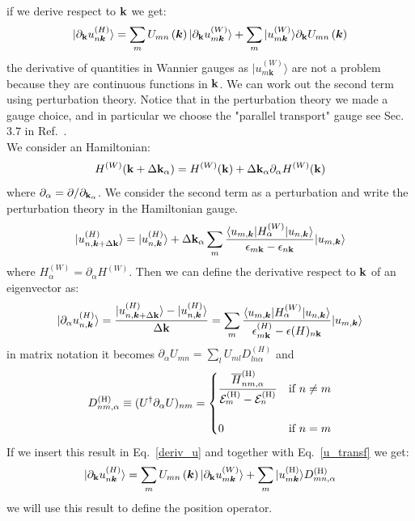 \documentclass[preprint,showpacs,prb,superscriptaddress,aps,floatfix]{revtex4-1}
\newcommand{\kk}{{\bf k}}
\newcommand{\be}{\begin{equation}}
\newcommand{\ee}{\end{equation}}
\renewcommand{\[}{\left[}
\renewcommand{\]}{\right]}
\renewcommand{\(}{\left(}
\renewcommand{\)}{\right)}
\def\ket#1{\vert#1\rangle}
\def\bra#1{\langle#1\vert}
\def\ph{^{({\rm H})}}
\def\D{{D}\ph}
\begin{document}
if we derive respect to $\kk$ we get:
\begin{equation}
	\ket{ \partial_{\kk} u_{n\boldsymbol{k}}^{\left(H\right)}}=\sum_{m}U_{mn}\left(\boldsymbol{k}\right)\ket{\partial_{\kk} u_{m\boldsymbol{k}}^{\left(W\right)}} + \sum_{m}\ket{u_{m\boldsymbol{k}}^{\left(W\right)}} \partial_\kk U_{mn}\left(\boldsymbol{k}\right)
	\label{deriv_u}
\end{equation}
the derivative of quantities in Wannier gauges as $\ket{u_{m\boldsymbol{k}}^{\left(W\right)}}$ are not a problem because they are continuous functions in $\kk$. We can work out the second term using perturbation theory.\cite{wang2006ab} 
Notice that in the perturbation theory we made a gauge choice, and in particular we choose the "parallel transport" gauge see Sec.~$3.7$ in Ref.~. \\
We consider an Hamiltonian:
\be
H^{(W)} (\kk + \Delta \kk_\alpha) = H^{(W)} (\kk)  + \Delta \kk_\alpha \partial_\alpha  H^{(W)} (\kk)
\ee
where $\partial_\alpha = \partial/\partial_{\kk_\alpha}$. We consider the second term as a perturbation and write the perturbation theory in the Hamiltonian gauge.
\be
	\ket{ u_{n,\boldsymbol{k}+\Delta \kk}^{\left(H\right)}}=\ket{ u_{n,\boldsymbol{k}}^{\left(H\right)}}+\Delta \kk_\alpha \sum_{m} \frac{\bra{u_{m,\boldsymbol{k} }} H^{(W)}_\alpha   \ket{u_{n,\boldsymbol{k} }}}{\epsilon_{m\kk}-\epsilon_{n\kk}} \ket{u_{m,\boldsymbol{k} }}
\ee
where $ H^{(W)}_\alpha =\partial_\alpha  H^{(W)}$. Then we can define the derivative respect to $\kk$ of an eigenvector as:
\be
\ket{ \partial_\alpha u_{n,\boldsymbol{k}}^{\left(H\right)}}=	\frac{\ket{ u_{n,\boldsymbol{k}+\Delta \kk}^{\left(H\right)}}-\ket{ u_{n,\boldsymbol{k}}^{\left(H\right)}}}{\Delta \kk}= \sum_{m} \frac{\bra{u_{m,\boldsymbol{k} }} H^{(W)}_\alpha   \ket{u_{n,\boldsymbol{k} }}}{\epsilon^{(H)}_{m\kk}-\epsilon(H)_{n\kk}} \ket{u_{m,\boldsymbol{k} }}
\ee
in matrix notation it becomes $ \partial_\alpha U_{mn} = \sum_l U_{ml} D^{(H)}_{ln\alpha}$ and
\begin{equation}
\D_{nm,\alpha}\equiv (U^{\dagger}
\partial_{\alpha}U)_{nm}=
\begin{cases}
  \displaystyle
  \frac{\overline H_{nm,\alpha}^{(\rm H)}}{{\cal E}^{(\rm H)}_{m}
  -{\cal E}_{n}^{(\rm H)}}& \text{if $n\not= m$}\\ \\
  0& \text{if $n=m$}
\end{cases}
\label{eq:ddef}
\end{equation}
If we insert this result in Eq.~\ref{deriv_u} and together with Eq.~\ref{u_transf} we get:
\begin{equation}
	\ket{ \partial_{\kk} u_{n\boldsymbol{k}}^{\left(H\right)}}=\sum_{m}U_{mn}\left(\boldsymbol{k}\right)\ket{\partial_{\kk} u_{m\boldsymbol{k}}^{\left(W\right)}} + \sum_{m}\ket{u_{m\boldsymbol{k}}\ph} \D_{mn,\alpha}
	\label{deriv_uh}
\end{equation}
we will use this result to define the position operator.
\end{document}
